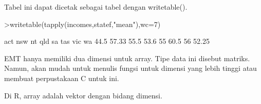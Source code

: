 \documentclass[a4paper,10pt]{article}
\begin{document}
\begin{eulernotebook}
\begin{eulercomment}
\begin{eulercomment}
\begin{eulercomment}
\begin{eulercomment}
\begin{eulercomment}
Tabel ini dapat dicetak sebagai tabel dengan writetable().
\end{eulercomment}
\begin{eulerprompt}
>writetable(tapply(incomes,statef,"mean"),wc=7)
\end{eulerprompt}
\begin{euleroutput}
      act    nsw     nt    qld     sa    tas    vic     wa
     44.5  57.33   55.5   53.6     55   60.5     56  52.25
\end{euleroutput}
\begin{eulercomment}
EMT hanya memiliki dua dimensi untuk array. Tipe data ini disebut
matriks. Namun, akan mudah untuk menulis fungsi untuk dimensi yang
lebih tinggi atau membuat perpustakaan C untuk ini.

Di R, array adalah vektor dengan bidang dimensi.


\end{eulercomment}
\end{eulercomment}
\end{eulercomment}
\end{eulercomment}
\end{eulercomment}
\end{eulernotebook}
\end{document}
